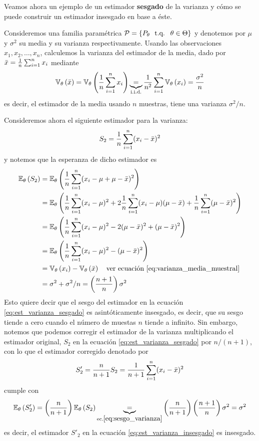 Veamos ahora un ejemplo de un estimador \textbf{sesgado} de la varianza y cómo se puede construir un estimador insesgado en base a éste. 

\begin{example}[Pythagoras]
Consideremos una familia paramétrica $\mathcal{P} = \{P_\theta\ {\text{ t.q. }}\ \theta\in\Theta\}$ y denotemos por $\mu$ y $\sigma^2$ su media y su varianza respectivamente. Usando las observaciones $x_1,x_2,\ldots,x_n$, calculemos la varianza del estimador de la media, dado por ${ \bar{x}} = \frac{1}{n}\sum_{i=1}^n x_i$ mediante
\begin{equation}
	\label{eq:varianza_media_muestral}
 	\mathbb{V}_\theta \left({ \bar{x}}\right) = \mathbb{V}_\theta \left(\frac{1}{n}	\sum_{i=1}^n x_i\right)  \underbrace{=}_{\text{i.i.d.}}  \frac{1}{n^2}	\sum_{i=1}^n\mathbb{V}_\theta \left( x_i\right) =\frac{\sigma^2}{n}
 \end{equation} 
 es decir, el estimador de la media usando $n$ muestras, tiene una varianza $\sigma^2/n$.

 Consideremos ahora el siguiente estimador para la varianza: 
\begin{equation}
	\label{eq:est_varianza_sesgado}
	S_2 = \frac{1}{n}\sum_{i=1}^n (x_i-{ \bar{x}})^2
\end{equation}
y notemos que la esperanza de dicho estimador es
\begin{align}
	\label{eq:sesgo_varianza}
	\mathbb{E}_\theta \left(S_2 \right) &= \mathbb{E}_\theta \left(\frac{1}{n}\sum_{i=1}^n (x_i-\mu+\mu-{ \bar{x}})^2\right)\nonumber\\
				&= \mathbb{E}_\theta \left( \frac{1}{n}\sum_{i=1}^n(x_i-\mu)^2 + 2\frac{1}{n}\sum_{i=1}^n(x_i-\mu)(\mu-{ \bar{x}}) + \frac{1}{n}\sum_{i=1}^n(\mu-{ \bar{x}})^2\right)\nonumber\\
				&= \mathbb{E}_\theta \left( \frac{1}{n}\sum_{i=1}^n(x_i-\mu)^2 - 2(\mu-{ \bar{x}})^2 + (\mu-{ \bar{x}})^2\right)\nonumber\\
				&= \mathbb{E}_\theta \left( \frac{1}{n}\sum_{i=1}^n(x_i-\mu)^2 - (\mu-{ \bar{x}})^2\right)\nonumber\\
				&= \mathbb{V}_\theta \left(x_i\right) - \mathbb{V}_\theta \left({ \bar{x}}\right)\quad\text{ver ecuación \eqref{eq:varianza_media_muestral}}\nonumber\\
				&= 	\sigma^2 + \sigma^2/n = \left(\frac{n+1}{n}\right)\sigma^2
\end{align}
Esto quiere decir que el sesgo del estimador en la ecuación \eqref{eq:est_varianza_sesgado} es asintóticamente insesgado, es decir, que su sesgo tiende a cero cuando el número de muestas $n$ tiende a infinito. Sin embargo, notemos que podemos corregir el estimador de la varianza multiplicando el estimador original, $S_2$ en la ecuación \eqref{eq:est_varianza_sesgado} por $n/(n+1)$, con lo que el estimador corregido denotado por 
\begin{equation}
	\label{eq:est_varianza_insesgado}
	S'_2 = \frac{n}{n+1}S_2 =  \frac{1}{n+1}\sum_{i=1}^n (x_i-{ \bar{x}})^2
\end{equation}
cumple con
\begin{equation}
	\mathbb{E}_\theta \left(S'_2 \right) =  \left(\frac{n}{n+1}\right)\mathbb{E}_\theta \left(S_2\right) \underbrace{=}_{\text{ec.}\eqref{eq:sesgo_varianza}} \left(\frac{n}{n+1}\right) \left(\frac{n+1}{n}\right)\sigma^2 = \sigma^2
\end{equation}
es decir, el estimador $S'_2$ en la ecuación \eqref{eq:est_varianza_insesgado} es insesgado.
\end{example}






